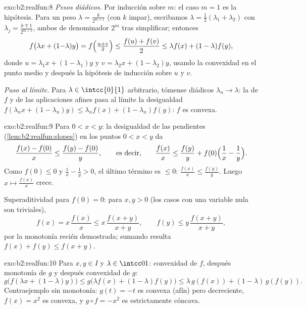 \begin{solution}{exo:b2:realfun:8}
\emph{Pesos diádicos.} Por inducción sobre $m$: el caso $m = 1$ es
la hipótesis. Para un peso $\lambda = \frac{k}{2^{m+1}}$ (con $k$
impar), escribamos $\lambda = \frac12(\lambda_1 + \lambda_2)$ con
$\lambda_j = \frac{k \mp 1}{2^{m+1}}$, ambos de denominador $2^m$
tras simplificar; entonces
\[
f\bigl(\lambda x + (1{-}\lambda)y\bigr)
= f\Bigl(\tfrac{u + v}{2}\Bigr)
\leq \frac{f(u) + f(v)}{2}
\leq \lambda f(x) + (1 - \lambda) f(y),
\]
donde $u = \lambda_1 x + (1 - \lambda_1)y$ y $v = \lambda_2 x +
(1-\lambda_2)y$, usando la convexidad en el punto medio y después la
hipótesis de inducción sobre $u$ y $v$.

\emph{Paso al límite.} Para $\lambda \in \intcc{0}{1}$ arbitrario,
tómense diádicos $\lambda_n \to \lambda$: la  de $f$ y de
las aplicaciones afines pasa al límite la desigualdad $f(\lambda_n x
+ (1-\lambda_n)y) \leq \lambda_n f(x) + (1-\lambda_n)f(y)$: $f$ es
convexa.
\end{solution}

\begin{solution}{exo:b2:realfun:9}
Para $0 < x < y$: la desigualdad de las pendientes
(\cref{lem:b2:realfun:slopes}) en los puntos $0 < x < y$ da
\[
\frac{f(x) - f(0)}{x} \leq \frac{f(y) - f(0)}{y},
\qquad\text{es decir,}\qquad
\frac{f(x)}{x} \leq \frac{f(y)}{y} +
f(0)\Bigl(\frac1x - \frac1y\Bigr).
\]
Como $f(0) \leq 0$ y $\frac1x - \frac1y > 0$, el último término es
$\leq 0$: $\frac{f(x)}{x} \leq \frac{f(y)}{y}$. Luego $x \mapsto
\frac{f(x)}x$ crece.

Superaditividad para $f(0) = 0$: para $x, y > 0$ (los casos con una
variable nula son triviales),
\[
f(x) = x\,\frac{f(x)}{x} \leq x\,\frac{f(x+y)}{x+y},
\qquad
f(y) \leq y\,\frac{f(x+y)}{x+y},
\]
por la monotonía recién demostrada; sumando resulta $f(x) + f(y)
\leq f(x+y)$.
\end{solution}

\begin{solution}{exo:b2:realfun:10}
Para $x, y \in I$ y $\lambda \in \intcc01$: convexidad de $f$,
después monotonía de $g$ y después convexidad de $g$:
\[
g\bigl(f(\lambda x + (1{-}\lambda)y)\bigr)
\leq g\bigl(\lambda f(x) + (1{-}\lambda)f(y)\bigr)
\leq \lambda\,g(f(x)) + (1{-}\lambda)\,g(f(y)).
\]
Contraejemplo sin monotonía: $g(t) = -t$ es convexa (afín) pero
decreciente, $f(x) = x^2$ es convexa, y $g \circ f = -x^2$ es
estrictamente cóncava.
\end{solution}

